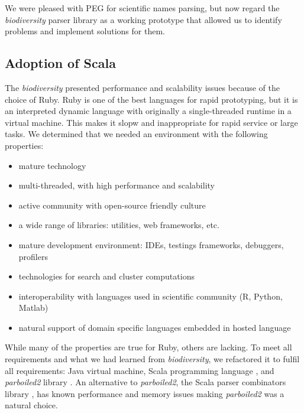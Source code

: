 \documentclass{bmcart}
\begin{document}
We were pleased with PEG for scientific
names parsing, but now regard the \textit{biodiversity} parser library as a working prototype that allowed us to identify  problems and implement
solutions for them.

\subsection*{Adoption of Scala}

The \textit{biodiversity} presented performance and scalability issues
because of the choice of Ruby. Ruby is one of the best languages for rapid
prototyping, but it is an interpreted dynamic language with
originally a single-threaded runtime in a virtual machine. This makes it slopw and inappropriate for rapid service or large tasks. We determined that we needed an environment with the following properties:

\begin{itemize}
    \item mature technology
    \item multi-threaded, with high performance and scalability
    \item active community with open-source friendly culture
    \item a wide range of libraries: utilities, web frameworks, etc.
    \item mature development environment: IDEs, testings frameworks,
    debuggers, profilers
    \item technologies for search and cluster computations
    \item interoperability with languages used in scientific community (R,
    Python, Matlab)
    \item natural support of domain specific languages embedded in hosted
    language
\end{itemize}
While many of the properties are true for Ruby, others are lacking. To meet all requirements and what we had learned from \textit{biodiversity}, we refactored it to fulfil all requirements: Java
virtual machine, Scala programming language \cite{odersky2004overview}, and
\textit{parboiled2} library \cite{parboiled2}. An alternative to
\textit{parboiled2}, the Scala parser combinators library
\cite{moors2008parser}, has known performance and memory
issues making \textit{parboiled2} was a natural choice.
\end{document}
